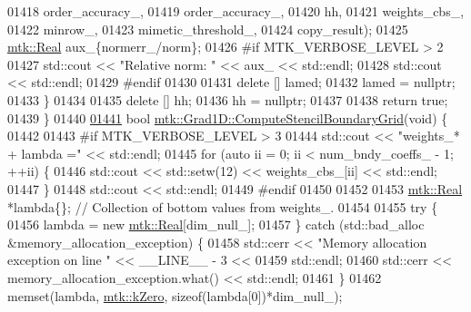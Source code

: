 \begin{DoxyCode}
{{01418                                                         order\_accuracy\_,
01419                                                         order\_accuracy\_,
01420                                                         hh,
01421                                                         weights\_cbs\_,
01422                                                         minrow\_,
01423                                                         mimetic\_threshold\_,
01424                                                         copy\_result);
01425     \hyperlink{group__c01-roots_gac080bbbf5cbb5502c9f00405f894857d}{mtk::Real} aux\_\{normerr\_/norm\};
01426 \textcolor{preprocessor}{    #if MTK\_VERBOSE\_LEVEL > 2}
01427     std::cout << \textcolor{stringliteral}{"Relative norm: "} << aux\_ << std::endl;
01428     std::cout << std::endl;
01429 \textcolor{preprocessor}{    #endif}
01430 
01431     \textcolor{keyword}{delete} [] lamed;
01432     lamed = \textcolor{keyword}{nullptr};
01433   \}
01434 
01435   \textcolor{keyword}{delete} [] hh;
01436   hh = \textcolor{keyword}{nullptr};
01437 
01438   \textcolor{keywordflow}{return} \textcolor{keyword}{true};
01439 \}
01440 
\hypertarget{mtk__grad__1d_8cc_source_l01441}{}\hyperlink{classmtk_1_1Grad1D_a7ad1cecf6b52647263208ffaea0ee1e5}{01441} \textcolor{keywordtype}{bool} \hyperlink{classmtk_1_1Grad1D_a7ad1cecf6b52647263208ffaea0ee1e5}{mtk::Grad1D::ComputeStencilBoundaryGrid}(\textcolor{keywordtype}{void}) \{
01442 
01443 \textcolor{preprocessor}{  #if MTK\_VERBOSE\_LEVEL > 3}
01444   std::cout << \textcolor{stringliteral}{"weights\_* + lambda ="} << std::endl;
01445   \textcolor{keywordflow}{for} (\textcolor{keyword}{auto} ii = 0; ii < num\_bndy\_coeffs\_ - 1; ++ii) \{
01446     std::cout << std::setw(12) << weights\_cbs\_[ii] << std::endl;
01447   \}
01448   std::cout << std::endl;
01449 \textcolor{preprocessor}{  #endif}
01450 
01452 
01453   \hyperlink{group__c01-roots_gac080bbbf5cbb5502c9f00405f894857d}{mtk::Real} *lambda\{\}; \textcolor{comment}{// Collection of bottom values from weights\_.}
01454 
01455   \textcolor{keywordflow}{try} \{
01456     lambda = \textcolor{keyword}{new} \hyperlink{group__c01-roots_gac080bbbf5cbb5502c9f00405f894857d}{mtk::Real}[dim\_null\_];
01457   \} \textcolor{keywordflow}{catch} (std::bad\_alloc &memory\_allocation\_exception) \{
01458     std::cerr << \textcolor{stringliteral}{"Memory allocation exception on line "} << \_\_LINE\_\_ - 3 <<
01459       std::endl;
01460     std::cerr << memory\_allocation\_exception.what() << std::endl;
01461   \}
01462   memset(lambda, \hyperlink{group__c01-roots_ga59a451a5fae30d59649bcda274fea271}{mtk::kZero}, \textcolor{keyword}{sizeof}(lambda[0])*dim\_null\_);
}}
\end{DoxyCode}
